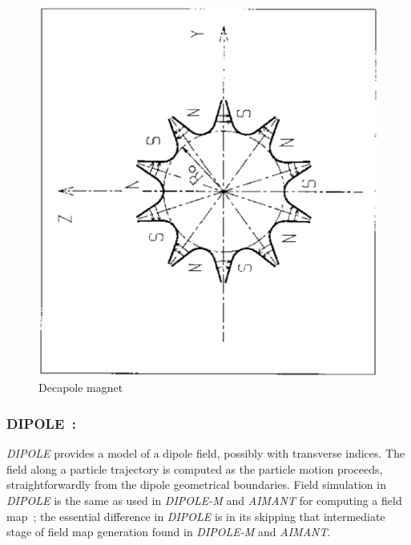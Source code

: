 \begin{figure}[H]
\centerline{\includegraphics[width=12cm,angle=-90]{Fig18.ps}}
\caption{\label{fig18}Decapole magnet}
\end{figure}
\vfill








\newpage

\subsubsection*{DIPOLE~: \DIPOLETitl} \label{DIPOLE} 
\medskip

\noindent\textsl{DIPOLE} provides a model of a dipole field, possibly with transverse indices. 
 The field along a particle trajectory is computed as the 
particle motion proceeds, straightforwardly from the dipole geometrical boundaries. 
Field simulation  in \textsl{DIPOLE}  is the same as used in \textsl{DIPOLE-M} and \textsl{AIMANT} 
for computing a field map~; the essential difference in \textsl{DIPOLE} is in its skipping that 
intermediate stage of field map generation found in \textsl{DIPOLE-M} and \textsl{AIMANT}. 

\bigskip

